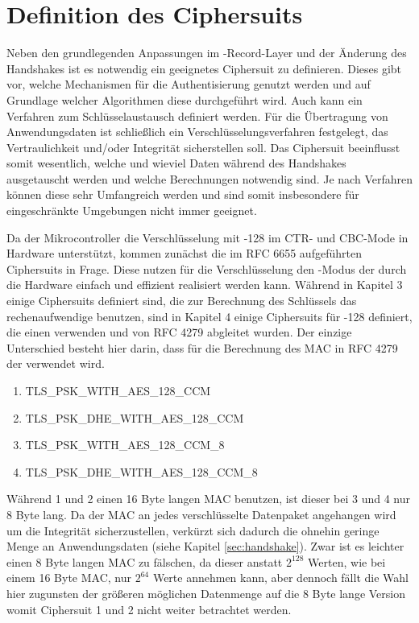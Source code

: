 \chapter{Definition des Ciphersuits}

Neben den grundlegenden Anpassungen im -Record-Layer und der Änderung des Handshakes ist es notwendig ein geeignetes Ciphersuit zu definieren.
Dieses gibt vor, welche Mechanismen für die Authentisierung genutzt werden und auf Grundlage welcher Algorithmen diese durchgeführt wird. Auch kann
ein Verfahren zum Schlüsselaustausch definiert werden. Für die Übertragung von Anwendungsdaten ist schließlich ein Verschlüsselungsverfahren festgelegt,
das Vertraulichkeit und/oder Integrität sicherstellen soll. Das Ciphersuit beeinflusst somit wesentlich, welche und wieviel Daten während des Handshakes
ausgetauscht werden und welche Berechnungen notwendig sind. Je nach Verfahren können diese sehr Umfangreich werden und sind somit insbesondere für eingeschränkte
Umgebungen nicht immer geeignet.

Da der Mikrocontroller die Verschlüsselung mit -128 im CTR- und CBC-Mode in Hardware unterstützt, kommen zunächst die im RFC 6655 \cite{rfc6655}
aufgeführten Ciphersuits in Frage. Diese nutzen für die Verschlüsselung den -Modus der durch die Hardware einfach und effizient realisiert werden
kann. Während in Kapitel 3 einige Ciphersuits definiert sind, die zur Berechnung des Schlüssels das rechenaufwendige  benutzen, sind in Kapitel 4
einige Ciphersuits für -128 definiert, die einen  verwenden und von RFC 4279 \cite{rfc4279} abgleitet wurden. Der einzige Unterschied besteht
hier darin, dass für die Berechnung des MAC in RFC 4279 der  verwendet wird.
\begin{enumerate}
  \item TLS\_PSK\_WITH\_AES\_128\_CCM
  \item TLS\_PSK\_DHE\_WITH\_AES\_128\_CCM
  \item TLS\_PSK\_WITH\_AES\_128\_CCM\_8
  \item TLS\_PSK\_DHE\_WITH\_AES\_128\_CCM\_8
\end{enumerate}
Während 1 und 2 einen 16 Byte langen MAC benutzen, ist dieser bei 3 und 4 nur 8 Byte lang. Da der MAC an jedes verschlüsselte Datenpaket angehangen wird um die
Integrität sicherzustellen, verkürzt sich dadurch die ohnehin geringe Menge an Anwendungsdaten (siehe Kapitel \ref{sec:handshake}). Zwar ist es leichter
einen 8 Byte langen MAC zu fälschen, da dieser anstatt $ 2^128 $ Werten, wie bei einem 16 Byte MAC, nur $ 2^64 $ Werte annehmen kann, aber dennoch fällt die
Wahl hier zugunsten der größeren möglichen Datenmenge auf die 8 Byte lange Version womit Ciphersuit 1 und 2 nicht weiter betrachtet werden.


